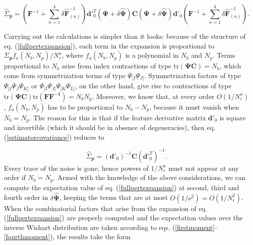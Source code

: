 \documentclass[reprint,aps,prd,superscriptaddress,showkeys,showpacs]{revtex4-1}
\newcommand{\bb}[1]{\mathbf{#1}}
\newcommand{\bbh}[1]{\mathbf{\hat{#1}}}
\newcommand{\h}[1]{\hat{#1}}
\begin{document}
\begin{widetext}
\begin{equation}
\label{fullpertexpansion}
\h{\Sigma}_\bb{p} = \left(\bb{F}^{-1}+\sum_{n=1}^4\delta\bbh{F}^{-1}_{(n)}\right)\bb{d}'^T_0(\bb{\Psi}+\delta\bbh{\Psi})\bb{C}(\bb{\Psi}+\delta\bbh{\Psi})\bb{d}'_0\left(\bb{F}^{-1}+\sum_{n=1}^4\delta\bbh{F}^{-1}_{(n)}\right).
\end{equation}
\end{widetext}
%
Carrying out the calculations is simpler than it looks: because of the
structure of eq. (\ref{fullpertexpansion}), each term in the expansion
is proportional to $\Sigma_\bb{p}f_a(N_b,N_p)/N_r^a$, where
$f_a(N_b,N_p)$ is a polynomial in $N_b$ and $N_p$. Terms proportional
to $N_b$ arise from index contractions of type $\mathrm{tr}(\bb{\Psi
  C})=N_b$, which come from symmetrization terms of type
$\Psi_{[I}\Psi_{J]}$. Symmetrization factors of type
$\Psi_{[I}\Psi_J\Psi_{K]}$ or $\Psi_{[I}\Psi_{J]}\Psi_{[K}\Psi_{L]}$,
on the other hand, give rise to contractions of type
$\mathrm{tr}(\bb{\Psi
  C})\mathrm{tr}(\bb{\bb{F}\bb{F}^{-1}})=N_bN_p$. Moreover, we know
that, at every order $O(1/N_r^a)$, $f_a(N_b,N_p)$ has to be
proportional to $N_b-N_p$, because it must vanish when $N_b=N_p$. The
reason for this is that if the feature derivative matrix $\bb{d}'_0$
is square and invertible (which it should be in absence of
degeneracies), then eq. (\ref{estimatorcovariance}) reduces to

\begin{equation}
\h{\Sigma}_\bb{p} = (\bb{d}'_0)^{-1}\bb{C}(\bb{d}'^T_0)^{-1}.
\end{equation} 
%
Every trace of the noise is gone, hence powers of $1/N_r^a$ must not
appear at any order if $N_b=N_p$. Armed with the knowledge of the
above considerations, we can compute the expectation value of
eq. (\ref{fullpertexpansion}) at second, third and fourth order in
$\delta\bbh{\Psi}$, keeping the terms that are at most
$O(1/\nu^2)=O(1/N_r^2)$. When the combinatorial factors that arise
from the expansion of eq. (\ref{fullpertexpansion}) are properly
computed and the expectation values over the inverse Wishart
distribution are taken according to
eqs. (\ref{firstmoment}--\ref{fourthmoment}), the results take the form
\end{document}
